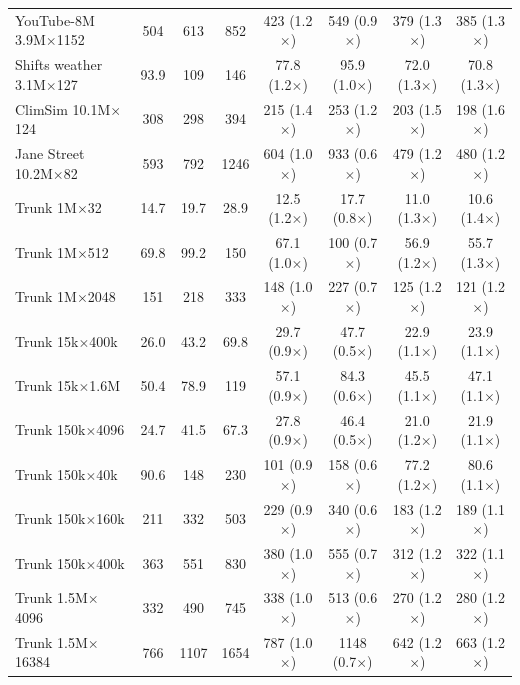 \begin{table}[p]
\begin{tabular}{l|ccc|cccc}
        YouTube-8M 3.9M$\times$1152 & 504 & 613 & 852 & 423 (1.2$\times$) & 549 (0.9$\times$) & 379 (1.3$\times$) & 385 (1.3$\times$) \\
        Shifts weather 3.1M$\times$127 & 93.9 & 109 & 146 & 77.8 (1.2$\times$) & 95.9 (1.0$\times$) & 72.0 (1.3$\times$) & 70.8 (1.3$\times$) \\
        ClimSim 10.1M$\times$124 & 308 & 298 & 394 & 215 (1.4$\times$) & 253 (1.2$\times$) & 203 (1.5$\times$) & 198 (1.6$\times$) \\
        Jane Street 10.2M$\times$82 & 593 & 792 & 1246 & 604 (1.0$\times$) & 933 (0.6$\times$) & 479 (1.2$\times$) & 480 (1.2$\times$) \\
        Trunk 1M$\times$32 & 14.7 & 19.7 & 28.9 & 12.5 (1.2$\times$) & 17.7 (0.8$\times$) & 11.0 (1.3$\times$) & 10.6 (1.4$\times$) \\
        Trunk 1M$\times$512 & 69.8 & 99.2 & 150 & 67.1 (1.0$\times$) & 100 (0.7$\times$) & 56.9 (1.2$\times$) & 55.7 (1.3$\times$) \\
        Trunk 1M$\times$2048 & 151 & 218 & 333 & 148 (1.0$\times$) & 227 (0.7$\times$) & 125 (1.2$\times$) & 121 (1.2$\times$) \\
        Trunk 15k$\times$400k & 26.0 & 43.2 & 69.8 & 29.7 (0.9$\times$) & 47.7 (0.5$\times$) & 22.9 (1.1$\times$) & 23.9 (1.1$\times$) \\
        Trunk 15k$\times$1.6M & 50.4 & 78.9 & 119 & 57.1 (0.9$\times$) & 84.3 (0.6$\times$) & 45.5 (1.1$\times$) & 47.1 (1.1$\times$) \\
        Trunk 150k$\times$4096 & 24.7 & 41.5 & 67.3 & 27.8 (0.9$\times$) & 46.4 (0.5$\times$) & 21.0 (1.2$\times$) & 21.9 (1.1$\times$) \\
        Trunk 150k$\times$40k & 90.6 & 148 & 230 & 101 (0.9$\times$) & 158 (0.6$\times$) & 77.2 (1.2$\times$) & 80.6 (1.1$\times$) \\
        Trunk 150k$\times$160k & 211 & 332 & 503 & 229 (0.9$\times$) & 340 (0.6$\times$) & 183 (1.2$\times$) & 189 (1.1$\times$) \\
        Trunk 150k$\times$400k & 363 & 551 & 830 & 380 (1.0$\times$) & 555 (0.7$\times$) & 312 (1.2$\times$) & 322 (1.1$\times$) \\
        Trunk 1.5M$\times$4096 & 332 & 490 & 745 & 338 (1.0$\times$) & 513 (0.6$\times$) & 270 (1.2$\times$) & 280 (1.2$\times$) \\
        Trunk 1.5M$\times$16384 & 766 & 1107 & 1654 & 787 (1.0$\times$) & 1148 (0.7$\times$) & 642 (1.2$\times$) & 663 (1.2$\times$) \\

\end{tabular}
\end{table}
